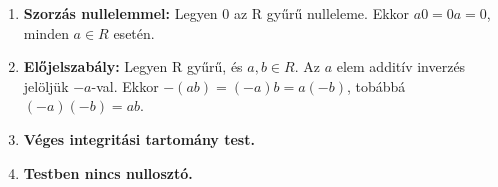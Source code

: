 \documentclass{beamer}
\begin{document}
\begin{frame}
\begin{tcolorbox}[title={Def.: Abel-csoport}]
\end{tcolorbox}

\begin{tcolorbox}[title={Def.: $n$ tényezős szorzat / Hatványozás egész kitevővel}]
\end{tcolorbox}
\end{frame}

\begin{frame}

\begin{tcolorbox}[title={Def.: Gyűrűk}]

\end{tcolorbox}
\end{frame}

\begin{frame}
\begin{tcolorbox}[title={Algebrai struktúrák kpacsolata (Kép)}]
\end{tcolorbox}
\end{frame}

\begin{frame}
\begin{tcolorbox}[title={Lemma: Észrevételek gyűrűkben}]
\begin{enumerate}
\item \textbf{Szorzás nullelemmel:} Legyen 0 az R gyűrű nulleleme. Ekkor $a0 = 0a = 0$, minden $a \in R$ esetén.
\item \textbf{Előjelszabály:} Legyen R gyűrű, és $a, b \in R$. Az $a$ elem additív inverzés jelöljük $-a$-val. Ekkor $-(ab) = (-a)b = a(-b)$, tobábbá $(-a)(-b) = ab$.
\item \textbf{Véges integritási tartomány test.}
\item \textbf{Testben nincs nullosztó.}
\end{enumerate}
\end{tcolorbox}
\end{frame}
\end{document}
